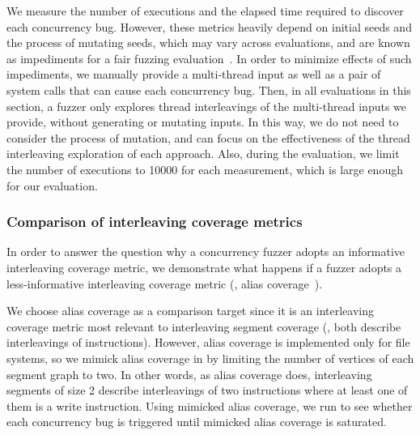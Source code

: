 %
We measure the number of executions and the elapsed time required to
discover each concurrency bug.
%
However, these metrics heavily depend on initial seeds and the process
of mutating seeds, which may vary across evaluations, and are known as
impediments for a fair fuzzing evaluation~\cite{fuzzingeval}.
%
In order to minimize effects of such impediments, we manually provide
a multi-thread input as well as a pair of system calls that can cause
each concurrency bug.
%
Then, in all evaluations in this section, a fuzzer only explores
thread interleavings of the multi-thread inputs we provide, without
generating or mutating inputs.
%
In this way, we do not need to consider the process of mutation, and
can focus on the effectiveness of the thread interleaving exploration
of each approach.
%
Also, during the evaluation, we limit the number of executions to
10000 for each measurement, which is large enough for our evaluation.
%





\subsubsection{Comparison of interleaving coverage metrics}
\label{sss:interleavingcoverage}
%
In order to answer the question why a concurrency fuzzer adopts an
informative interleaving coverage metric, we demonstrate what happens
if a fuzzer adopts a less-informative interleaving coverage metric
(\eg, alias coverage~\cite{krace}).


%
We choose alias coverage as a comparison target since it is an
interleaving coverage metric most relevant to interleaving segment
coverage (\ie, both describe interleavings of instructions).
%
However, alias coverage is implemented only for file systems, so we
mimick alias coverage in \sys by limiting the number of vertices of
each segment graph to two. In other words, as alias coverage does,
interleaving segments of size 2 describe interleavings of two
instructions where at least one of them is a write instruction.
%
Using mimicked alias coverage, we run \sys to see whether each
concurrency bug is triggered until mimicked alias coverage is
saturated.




